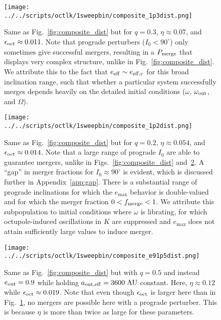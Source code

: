 \documentclass[
        fleqn,
        usenatbib,
    ]{mnras}
\newlength{\colummwidth}
\begin{document}
\begin{figure}
    \centering
    \texttt{[image: ../../scripts/octlk/1sweepbin/composite\_1p3dist.png]}
    \caption{Same as Fig.~\ref{fig:composite_dist} but for $q = 0.3$, $\eta
    \approx 0.07$, and $\epsilon_{\rm oct} \approx 0.011$. Note that prograde
    perturbers ($I_0 < 90^\circ$) only sometimes give successful mergers,
    resulting in a $P_{\rm merge}$ that displays very complex structure, unlike
    in Fig.~\ref{fig:composite_dist}. We attribute this to the fact that $e_{\rm
    eff} \sim e_{\rm eff, c}$ for this broad inclination range, such that
    whether a particular system successfully merges depends heavily on the
    detailed initial conditions ($\omega$, $\omega_{\rm out}$, and $\Omega$).
    }\label{fig:composite_1p2}
\end{figure}
\begin{figure}
    \centering
    \texttt{[image: ../../scripts/octlk/1sweepbin/composite\_1p2dist.png]}
    \caption{Same as Fig.~\ref{fig:composite_dist} but for $q = 0.2$, $\eta
    \approx 0.054$, and $\epsilon_{\rm oct} \approx 0.014$. Note that a large
    range of prograde $I_0$ are able to guarantee mergers, unlike in
    Figs.~\ref{fig:composite_dist} and~\ref{fig:composite_1p3}. A ``gap'' in
    merger fractions for $I_0 \approx 90^\circ$ is evident, which is discussed
    further in Appendix~\ref{app:gap}. There is a substantial range of prograde
    inclinations for which the $e_{\max}$ behavior is double-valued and for
    which the merger fraction $0 < f_{\rm merge} < 1$. We attribute this
    subpopulation to initial conditions where $\omega$ is librating, for which
    octupole-induced oscillations in $K$ are suppressed \citep{katz2011long} and
    $e_{\max}$ does not attain sufficiently large values to induce merger.
    }\label{fig:composite_1p3}
\end{figure}
\begin{figure}
    \centering
    \texttt{[image: ../../scripts/octlk/1sweepbin/composite\_e91p5dist.png]}
    \caption{Same as Fig.~\ref{fig:composite_dist} but with $q = 0.5$ and
    instead $e_{\rm out} = 0.9$ while holding $a_{\rm out, eff} =
    3600\;\mathrm{AU}$ constant. Here, $\eta \approx 0.12$ while $\epsilon_{\rm
    oct} \approx 0.019$. Note that even though $\epsilon_{\rm oct}$ is larger
    here than in Fig.~\ref{fig:composite_1p2}, no mergers are possible here with
    a prograde perturber. This is because $\eta$ is more than twice as large for
    these parameters. }\label{fig:composite_e91p5}
\end{figure}
\end{document}

